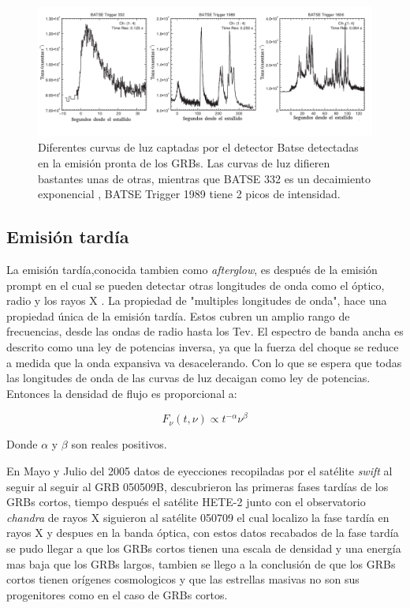 \documentclass[12pt,a4paper]{book}
\begin{document}
\begin{figure}
\centering %
\includegraphics[width=1.0\textwidth]{Figuras/lightcurve_different}
\caption{\label{lightcurve} Diferentes curvas de luz captadas por el detector Batse detectadas en la emisión pronta de los GRBs. Las curvas de luz difieren bastantes unas de otras, mientras que BATSE 332 es un decaimiento exponencial , BATSE Trigger 1989  tiene 2 picos de intensidad. }
\end{figure}
\subsection{Emisión tardía}
La emisión tardía,conocida tambien como \emph{afterglow},  es después de la emisión prompt en el cual se pueden detectar otras longitudes de onda como el óptico, radio y los rayos X \cite{Berger:2013jza, PGRB-piran, SGRBr-Avanzo}. %
La propiedad de "multiples longitudes de onda", hace una propiedad única de la emisión tardía. Estos cubren un amplio rango de frecuencias, desde las ondas de radio hasta los Tev. El espectro de banda ancha es descrito como una ley de potencias inversa, ya que la fuerza del choque se reduce a medida que la onda expansiva va desacelerando. Con lo que se espera que todas las longitudes de onda de las curvas de luz decaigan como ley de potencias. Entonces la densidad de flujo es proporcional a:

\begin{equation}
F_{\nu}(t,\nu) \propto t^{-\alpha} \nu^{\beta}
\end{equation}

Donde $\alpha$ y $\beta$ son reales positivos.


 En Mayo y Julio del 2005 datos de eyecciones recopiladas por el satélite \emph{swift} al seguir al seguir al GRB 050509B, descubrieron las primeras fases tardías de los GRBs cortos, tiempo después el satélite HETE-2 junto con el observatorio \emph{chandra} de rayos X siguieron al satélite 050709 el cual localizo la fase tardía en rayos X y despues en la banda óptica, con estos datos recabados de la fase tardía se pudo llegar a que los GRBs cortos tienen una escala de densidad y una energía mas baja que los GRBs largos, tambien se llego a la conclusión de que los GRBs cortos tienen orígenes cosmologicos \cite{Berger:2013jza} y que las estrellas masivas no son sus progenitores como en el caso de GRBs cortos.
 
\end{document}
